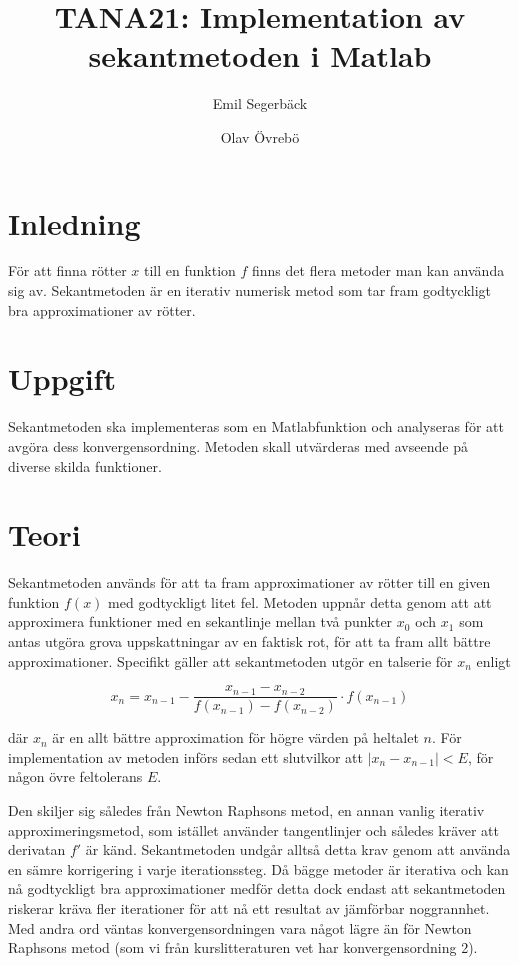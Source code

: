 \documentclass[12pt]{article}
\title{TANA21: Implementation av sekantmetoden i Matlab}
\author{Emil Segerbäck \and Olav Övrebö}
\begin{document}
\clearpage
\maketitle
\thispagestyle{empty}

\newpage
\setcounter{page}{1}

\section{Inledning}
För att finna rötter $x$ till en funktion $f$ finns det flera metoder man kan använda sig av. Sekantmetoden är en iterativ numerisk metod som tar fram godtyckligt bra approximationer av rötter.

\section{Uppgift}
Sekantmetoden ska implementeras som en Matlabfunktion och analyseras för att avgöra dess konvergensordning. Metoden skall utvärderas med avseende på diverse skilda funktioner.

\section{Teori}
Sekantmetoden används för att ta fram approximationer av rötter till en given funktion $f(x)$ med godtyckligt litet fel. Metoden uppnår detta genom att att approximera funktioner med en sekantlinje mellan två punkter $x_0$ och $x_1$ som antas utgöra grova uppskattningar av en faktisk rot, för att ta fram allt bättre approximationer. Specifikt gäller att sekantmetoden utgör en talserie för $x_n$ enligt

\[
x_{n} = x_{n-1} - \frac{x_{n-1} - x_{n-2}}{f(x_{n-1}) - f(x_{n-2})} \cdot f(x_{n-1})
\]

\noindent där $x_{n}$ är en allt bättre approximation för högre värden på heltalet $n$. För implementation av metoden införs sedan ett slutvilkor att $|x_{n} - x_{n-1}| < E$, för någon övre feltolerans $E$.

Den skiljer sig således från Newton Raphsons metod, en annan vanlig iterativ approximeringsmetod, som istället använder tangentlinjer och således kräver att derivatan $f'$ är känd. Sekantmetoden undgår alltså detta krav genom att använda en sämre korrigering i varje iterationssteg. Då bägge metoder är iterativa och kan nå godtyckligt bra approximationer medför detta dock endast att sekantmetoden riskerar kräva fler iterationer för att nå ett resultat av jämförbar noggrannhet. Med andra ord väntas konvergensordningen vara något lägre än för Newton Raphsons metod (som vi från kurslitteraturen vet har konvergensordning 2).
\end{document}
